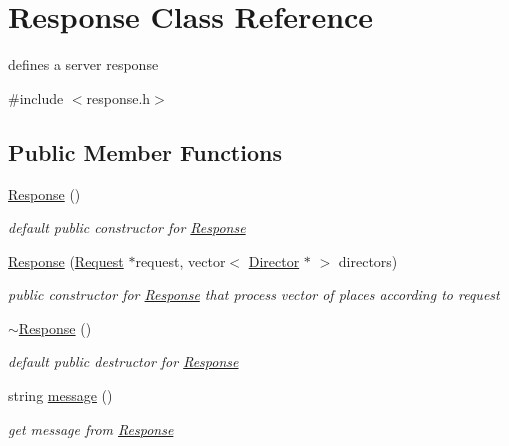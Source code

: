 \hypertarget{classResponse}{}\section{Response Class Reference}
\label{classResponse}


defines a server response  




{\ttfamily \#include $<$response.\+h$>$}

\subsection*{Public Member Functions}
\begin{DoxyCompactItemize}
\item 
\hyperlink{classResponse_aa9b6e391d77fce8daca8bac13730ec8e}{Response} ()\hypertarget{classResponse_aa9b6e391d77fce8daca8bac13730ec8e}{}\label{classResponse_aa9b6e391d77fce8daca8bac13730ec8e}

\begin{DoxyCompactList}\small\item\em default public constructor for \hyperlink{classResponse}{Response} \end{DoxyCompactList}\item 
\hyperlink{classResponse_afa9ac4d18636baffe1b63dd8907b757c}{Response} (\hyperlink{classRequest}{Request} $\ast$request, vector$<$ \hyperlink{classDirector}{Director} $\ast$ $>$ directors)
\begin{DoxyCompactList}\small\item\em public constructor for \hyperlink{classResponse}{Response} that process vector of places according to request \end{DoxyCompactList}\item 
\hyperlink{classResponse_a2a4a6403aaefce73725f17cf63896f84}{$\sim$\+Response} ()\hypertarget{classResponse_a2a4a6403aaefce73725f17cf63896f84}{}\label{classResponse_a2a4a6403aaefce73725f17cf63896f84}

\begin{DoxyCompactList}\small\item\em default public destructor for \hyperlink{classResponse}{Response} \end{DoxyCompactList}\item 
string \hyperlink{classResponse_a517690400a7b7091d03e917f335f7f28}{message} ()
\begin{DoxyCompactList}\small\item\em get message from \hyperlink{classResponse}{Response} \end{DoxyCompactList}\end{DoxyCompactItemize}



